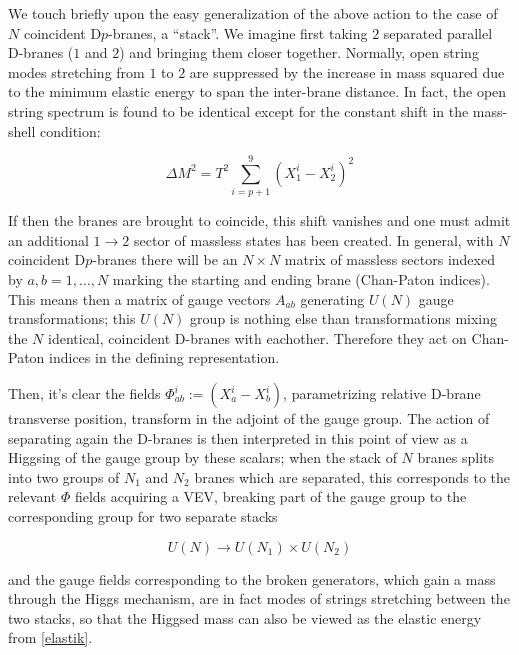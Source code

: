 \label{sec:branestacks}

We touch briefly upon the easy generalization of the above action to the case of $N$ coincident D$p$-branes, a ``stack''. We imagine first taking $2$ separated parallel D-branes ($1$ and $2$) and bringing them closer together. Normally, open string modes stretching from $1$ to $2$ are suppressed by the increase in mass squared due to the minimum elastic energy to span the inter-brane distance. In fact, the open string spectrum is found to be identical except for the constant shift in the mass-shell condition\cite{BBS}:

\begin{equation}
	\Delta M^2 = T^2 \sum_{i=p+1}^9 (X^i_1 - X^i_2)^2
	\label{elastik}
\end{equation}

If then the branes are brought to coincide, this shift vanishes and one must admit an additional $1\rightarrow2$ sector of massless states has been created. In general, with $N$ coincident D$p$-branes there will be an $N\times N$ matrix of massless sectors indexed by $a,b = 1,\ldots,N$ marking the starting and ending brane (Chan-Paton indices). This means then a matrix of gauge vectors $A_{ab}$ generating $U(N)$ gauge transformations; this $U(N)$ group is nothing else than transformations mixing the $N$ identical, coincident D-branes with eachother. Therefore they act on Chan-Paton indices in the defining representation.

Then, it's clear the fields $\Phi_{ab}^i := (X_a^i - X_b^i)$, parametrizing relative D-brane transverse position, transform in the adjoint of the gauge group. The action of separating again the D-branes is then interpreted in this point of view as a Higgsing of the gauge group by these scalars; when the stack of $N$ branes splits into two groups of $N_1$ and $N_2$ branes which are separated, this corresponds to the relevant $\Phi$ fields acquiring a VEV, breaking part of the gauge group to the corresponding group for two separate stacks

\begin{equation}
	U(N) \rightarrow U(N_1) \times U(N_2)
	\label{}
\end{equation}

and the gauge fields corresponding to the broken generators, which gain a mass through the Higgs mechanism, are in fact modes of strings stretching between the two stacks, so that the Higgsed mass can also be viewed as the elastic energy from \eqref{elastik}.


